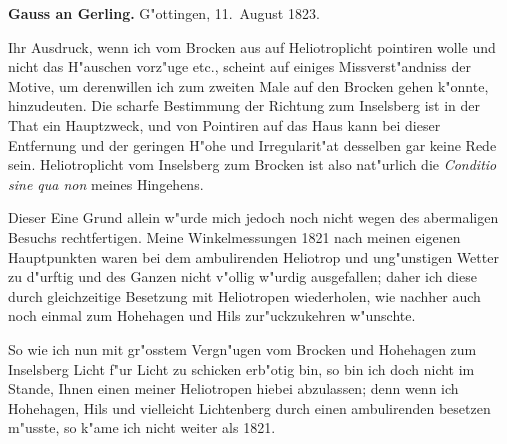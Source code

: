 \documentclass[12pt,a4paper]{article}
\theoremstyle{plain}
\theoremstyle{definition}
\theoremstyle{remark}
\begin{document}
\medskip
\noindent \textbf{Gauss an Gerling.} G"ottingen, 11.~August 1823.

\medskip
\noindent Ihr Ausdruck, wenn ich vom Brocken aus auf Heliotroplicht pointiren wolle und nicht das H"auschen vorz"uge etc., scheint auf einiges Missverst"andniss der Motive, um derenwillen ich zum zweiten Male auf den Brocken gehen k"onnte, hinzudeuten. Die scharfe Bestimmung der Richtung zum Inselsberg ist in der That ein Hauptzweck, und von Pointiren auf das Haus kann bei dieser Entfernung und der geringen H"ohe und Irregularit"at desselben gar keine Rede sein. Heliotroplicht vom Inselsberg zum Brocken ist also nat"urlich die \emph{Conditio sine qua non} meines Hingehens.

Dieser Eine Grund allein w"urde mich jedoch noch nicht wegen des abermaligen Besuchs rechtfertigen. Meine Winkelmessungen 1821 nach meinen eigenen Hauptpunkten waren bei dem ambulirenden Heliotrop und ung"unstigen Wetter zu d"urftig und des Ganzen nicht v"ollig w"urdig ausgefallen; daher ich diese durch gleichzeitige Besetzung mit Heliotropen wiederholen, wie nachher auch noch einmal zum Hohehagen und Hils zur"uckzukehren w"unschte.

\newpage
\noindent So wie ich nun mit gr"osstem Vergn"ugen vom Brocken und Hohehagen zum Inselsberg Licht f"ur Licht zu schicken erb"otig bin, so bin ich doch nicht im Stande, Ihnen einen meiner Heliotropen hiebei abzulassen; denn wenn ich Hohehagen, Hils und vielleicht Lichtenberg durch einen ambulirenden besetzen m"usste, so k"ame ich nicht weiter als 1821.
\end{document}
